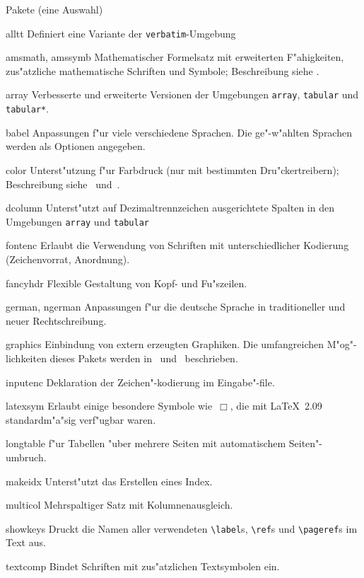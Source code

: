 \begin{table}[htbp]
\caption{Pakete (eine Auswahl)}\label{pack}
\oben{11cm}
\begin{ttdescription}%
\setlength{\itemsep}{.5\itemsep plus1pt minus1pt}
\item[alltt] Definiert eine Variante der \texttt{verbatim}-Umgebung
\item[amsmath, amssymb] Mathematischer Formelsatz mit erweiterten F"ahigkeiten,
  zus"atzliche mathematische Schriften und Symbole; Beschreibung siehe
  \cite{ch8}.
\item[array] Verbesserte und erweiterte Versionen der Umgebungen
  \texttt{array}, \texttt{tabular} und \texttt{tabular*}.
\item[babel] Anpassungen f"ur viele verschiedene Sprachen. Die
  ge"-w"ahlten Sprachen werden als Optionen angegeben.
\item[color] Unterst"utzung f"ur Farbdruck 
  (nur mit bestimmten Dru"ckertreibern); Beschreibung 
  siehe~\cite{grfguide} und~\cite{grfcomp}.
\item[dcolumn] Unterst"utzt auf Dezimaltrennzeichen ausgerichtete
  Spalten in den Umgebungen \texttt{array} und \texttt{tabular}
\item[fontenc] Erlaubt die Verwendung von Schriften mit
  unterschiedlicher Kodierung (Zeichenvorrat, Anordnung).
\item[fancyhdr] Flexible Gestaltung von Kopf- und Fu"szeilen.
\item[german, ngerman] Anpassungen f"ur die deutsche Sprache in
  traditioneller und neuer Rechtschreibung.
\item[graphics] Einbindung von extern erzeugten Graphiken.
  Die umfangreichen M"og"-lichkeiten dieses Pakets werden 
  in~\cite{grfguide} und~\cite{grfcomp} beschrieben.
\item[inputenc] Deklaration der Zeichen"-kodierung im
  Eingabe"-file.
\item[latexsym] Erlaubt einige besondere Symbole wie~\(\Box\),
  die mit \LaTeX~2.09 standardm"a"sig verf"ugbar waren.
\item[longtable]
  f"ur Tabellen "uber mehrere Seiten mit automatischem Seiten"-umbruch.
\item[makeidx] Unterst"utzt das Erstellen eines Index.
\item[multicol] Mehrspaltiger Satz mit Kolumnenausgleich.
\item[showkeys] Druckt die Namen aller verwendeten \verb:\label:s,
  \verb:\ref:s und \verb:\pageref:s im Text aus.
\item[textcomp] Bindet Schriften mit zus"atzlichen Textsymbolen ein.
\end{ttdescription}
\unten
\end{table}


